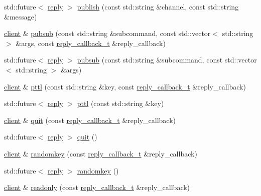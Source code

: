 \begin{DoxyCompactItemize}
\item 
std\+::future$<$ \hyperlink{classcpp__redis_1_1reply}{reply} $>$ \hyperlink{classcpp__redis_1_1client_ad9a8434b4ca46e185bab45cf135c9ac2}{publish} (const std\+::string \&channel, const std\+::string \&message)
\item 
\hyperlink{classcpp__redis_1_1client}{client} \& \hyperlink{classcpp__redis_1_1client_a4c606e08e8787971044b76930b99f30d}{pubsub} (const std\+::string \&subcommand, const std\+::vector$<$ std\+::string $>$ \&args, const \hyperlink{classcpp__redis_1_1client_a061a1140d36d2eaeda82b09a0bb3f9f2}{reply\+\_\+callback\+\_\+t} \&reply\+\_\+callback)
\item 
std\+::future$<$ \hyperlink{classcpp__redis_1_1reply}{reply} $>$ \hyperlink{classcpp__redis_1_1client_a9f5ae4ef589038af3f7e8304a56446e2}{pubsub} (const std\+::string \&subcommand, const std\+::vector$<$ std\+::string $>$ \&args)
\item 
\hyperlink{classcpp__redis_1_1client}{client} \& \hyperlink{classcpp__redis_1_1client_a2f10778d114d8144416b09645a7c6416}{pttl} (const std\+::string \&key, const \hyperlink{classcpp__redis_1_1client_a061a1140d36d2eaeda82b09a0bb3f9f2}{reply\+\_\+callback\+\_\+t} \&reply\+\_\+callback)
\item 
std\+::future$<$ \hyperlink{classcpp__redis_1_1reply}{reply} $>$ \hyperlink{classcpp__redis_1_1client_adf173046c5866f6a9b9cd297a79b3028}{pttl} (const std\+::string \&key)
\item 
\hyperlink{classcpp__redis_1_1client}{client} \& \hyperlink{classcpp__redis_1_1client_a455952961bd95a22630d1bd6c6a3f7a7}{quit} (const \hyperlink{classcpp__redis_1_1client_a061a1140d36d2eaeda82b09a0bb3f9f2}{reply\+\_\+callback\+\_\+t} \&reply\+\_\+callback)
\item 
std\+::future$<$ \hyperlink{classcpp__redis_1_1reply}{reply} $>$ \hyperlink{classcpp__redis_1_1client_a0b13beda169ce74720abf4bba2d69d68}{quit} ()
\item 
\hyperlink{classcpp__redis_1_1client}{client} \& \hyperlink{classcpp__redis_1_1client_a7ec81f685738479307e464db273201e6}{randomkey} (const \hyperlink{classcpp__redis_1_1client_a061a1140d36d2eaeda82b09a0bb3f9f2}{reply\+\_\+callback\+\_\+t} \&reply\+\_\+callback)
\item 
std\+::future$<$ \hyperlink{classcpp__redis_1_1reply}{reply} $>$ \hyperlink{classcpp__redis_1_1client_a021538472ad199d7a203a77af6aba96c}{randomkey} ()
\item 
\hyperlink{classcpp__redis_1_1client}{client} \& \hyperlink{classcpp__redis_1_1client_a14353780458071311d074fd951201f93}{readonly} (const \hyperlink{classcpp__redis_1_1client_a061a1140d36d2eaeda82b09a0bb3f9f2}{reply\+\_\+callback\+\_\+t} \&reply\+\_\+callback)

\end{DoxyCompactItemize}
